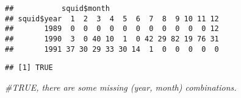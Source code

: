 \documentclass[
]{article}
\newenvironment{Shaded}{\begin{snugshade}}{\end{snugshade}}
\newcommand{\AttributeTok}[1]{\textcolor[rgb]{0.13,0.29,0.53}{#1}}
\newcommand{\CommentTok}[1]{\textcolor[rgb]{0.56,0.35,0.01}{\textit{#1}}}
\newcommand{\DecValTok}[1]{\textcolor[rgb]{0.00,0.00,0.81}{#1}}
\newcommand{\FunctionTok}[1]{\textcolor[rgb]{0.13,0.29,0.53}{\textbf{#1}}}
\newcommand{\NormalTok}[1]{#1}
\newcommand{\OtherTok}[1]{\textcolor[rgb]{0.56,0.35,0.01}{#1}}
\newcommand{\SpecialCharTok}[1]{\textcolor[rgb]{0.81,0.36,0.00}{\textbf{#1}}}
\begin{document}
\begin{Shaded}
\end{Shaded}

\begin{verbatim}
##           squid$month
## squid$year  1  2  3  4  5  6  7  8  9 10 11 12
##       1989  0  0  0  0  0  0  0  0  0  0  0 12
##       1990  3  0 40 10  1  0 42 29 82 19 76 31
##       1991 37 30 29 33 30 14  1  0  0  0  0  0
\end{verbatim}

\begin{Shaded}
\end{Shaded}

\begin{verbatim}
## [1] TRUE
\end{verbatim}

\begin{Shaded}
\begin{Highlighting}[]
\CommentTok{\#TRUE, there are some missing (year, month) combinations.}
\end{Highlighting}
\end{Shaded}

\begin{Shaded}
\end{Shaded}
\end{document}

